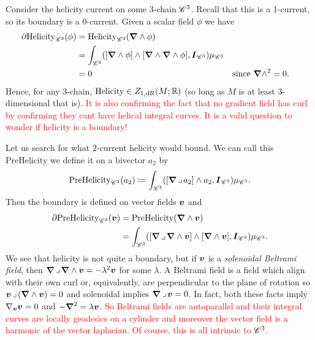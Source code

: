 \documentclass{article}
\begin{document}
\begin{example}\label{ex:helicity_and_beltrami}
Consider the helicity current on some 3-chain $\mathscr{C}^3$. Recall that this is a 1-current, so its boundary is a 0-current. Given a scalar field $\phi$ we have
\begin{align}
    \partial \mathrm{Helicity}_{\mathscr{C}^3}(\phi) &= \mathrm{Helicity}_{\mathscr{C}^3}(\boldsymbol{\nabla} \wedge \phi)\\
    &= \int_{\mathscr{C}^3}([\boldsymbol{\nabla} \wedge \phi] \wedge [\boldsymbol{\nabla} \wedge \boldsymbol{\nabla} \wedge \phi], \boldsymbol{I}_{\mathscr{C}^3})\mu_{\mathscr{C}^3}\\
    &=0 &&\textrm{since $\boldsymbol{\nabla} \wedge^2=0$}.
\end{align}
Hence, for any 3-chain, $\mathrm{Helicity}\in Z_{1,\mathrm{dR}}(M;\mathbb{R})$ (so long as $M$ is at least 3-dimensional that is). \textcolor{red}{It is also confirming the fact that no gradient field has curl by confirming they cant have helical integral curves. It is a valid question to wonder if helicity is a boundary!}

Let us search for what $2$-current helicity would bound. We can call this PreHelicity we define it on a bivector $a_2$ by
\begin{equation}
    \mathrm{PreHelicity}_{\mathscr{C}^3}(a_2) \coloneqq \int_{\mathscr{C}^3} ([\boldsymbol{\nabla} \hspace*{.5mm}\lrcorner \hspace*{.5mm} a_2]\wedge a_2, \boldsymbol{I}_{\mathscr{C}^3})\mu_{\mathscr{C}^3}.
\end{equation}
Then the boundary is defined on vector fields $\boldsymbol{v}$ and
\begin{align}
    \partial \mathrm{PreHelicity}_{\mathscr{C}^3}(\boldsymbol{v}) &= \mathrm{PreHelicity}(\boldsymbol{\nabla} \wedge \boldsymbol{v})\\
        &= \int_{\mathscr{C}^3} ([\boldsymbol{\nabla} \hspace*{.5mm}\lrcorner \hspace*{.5mm} \boldsymbol{\nabla} \wedge \boldsymbol{v}]\wedge [\boldsymbol{\nabla} \wedge \boldsymbol{v}],\boldsymbol{I}_{\mathscr{C}^3})\mu_{\mathscr{C}^3}.
\end{align}
We see that helicity is not quite a boundary, but if $\boldsymbol{v}$ is a \emph{solenoidal Beltrami field}, then $\boldsymbol{\nabla} \hspace*{.5mm}\lrcorner \hspace*{.5mm} \boldsymbol{\nabla} \wedge \boldsymbol{v} = -\lambda^2 \boldsymbol{v}$ for some $\lambda$. A Beltrami field is a field which align with their own curl or, equivalently, are perpendicular to the plane of rotation so $\boldsymbol{v} \hspace*{.5mm}\lrcorner \hspace*{.5mm} (\boldsymbol{\nabla} \wedge \boldsymbol{v})=0$ and solenoidal implies $\boldsymbol{\nabla} \hspace*{.5mm}\lrcorner \hspace*{.5mm} \boldsymbol{v}=0$. In fact, both these facts imply $\nabla_{\boldsymbol{v}}\boldsymbol{v}=0$ and $-\boldsymbol{\nabla}^2 = \lambda \boldsymbol{v}$. \textcolor{red}{So Beltrami fields are autoparallel and their integral curves are locally geodesics on a cylinder and moreover the vector field is a harmonic of the vector laplacian. Of course, this is all intrinsic to $\mathscr{C}^3$.}
\end{example}
\end{document}
